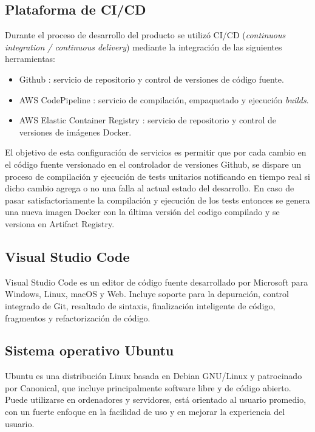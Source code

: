 


\subsection{Plataforma de CI/CD}
Durante el proceso de desarrollo del producto se utilizó CI/CD (\textit{continuous integration / continuous delivery}) mediante la integración de las siguientes herramientas:

\begin{itemize}
	\item Github \cite{SoftwareTool_Github}: servicio de repositorio y control de versiones de código fuente.
	\item AWS CodePipeline \cite{SoftwareTool_codePipeline}: servicio de compilación, empaquetado y ejecución \textit{builds}.
	\item AWS Elastic Container Registry \cite{SoftwareTool_ECR}: servicio de repositorio y control de versiones de imágenes Docker.
\end{itemize}

El objetivo de esta configuración de servicios es permitir que por cada cambio en el código fuente versionado en el controlador de versiones Github, se dispare un proceso de compilación y ejecución de tests unitarios notificando en tiempo real si dicho cambio agrega o no una falla al actual estado del desarrollo. En caso de pasar satisfactoriamente la compilación y ejecución de los tests entonces se genera una nueva imagen Docker con la última versión del codigo compilado y se versiona en Artifact Registry.

\subsection{Visual Studio Code}

Visual Studio Code \cite{vscode_website} es un editor de código fuente desarrollado por Microsoft para Windows, Linux, macOS y Web. Incluye soporte para la depuración, control integrado de Git, resaltado de sintaxis, finalización inteligente de código, fragmentos y refactorización de código.


\subsection{Sistema operativo Ubuntu}
Ubuntu \cite{ubuntu_website} es una distribución Linux basada en Debian GNU/Linux y patrocinado por Canonical, que incluye principalmente software libre y de código abierto. Puede utilizarse en ordenadores y servidores, está orientado al usuario promedio, con un fuerte enfoque en la facilidad de uso y en mejorar la experiencia del usuario.




